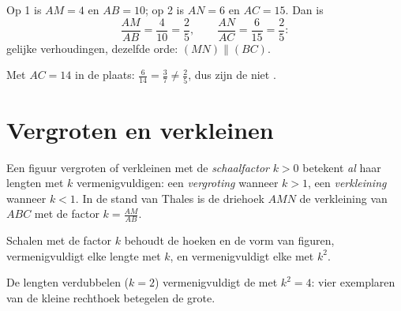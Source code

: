 \begin{example}\label{ex:g9:thales:converse}
Op  1 is $AM = 4$ en $AB = 10$; op  2 is $AN = 6$ en $AC = 15$. Dan is
\[
\frac{AM}{AB} = \frac{4}{10} = \frac25,
\qquad
\frac{AN}{AC} = \frac{6}{15} = \frac25 :
\]
gelijke verhoudingen, dezelfde orde: $(MN) \parallel (BC)$.

Met $AC = 14$ in de plaats: $\frac{6}{14} = \frac37 \neq \frac25$, dus zijn de
 niet .
\end{example}

\section{Vergroten en verkleinen}

\begin{definition}\label{def:g9:thales:scaling}
Een figuur vergroten of verkleinen met de \emph{schaalfactor}
$k > 0$ betekent \emph{al} haar lengten met $k$ vermenigvuldigen: een
\emph{vergroting} wanneer $k > 1$, een \emph{verkleining} wanneer $k < 1$. In de
stand van Thales is de driehoek $AMN$ de verkleining van $ABC$ met de factor
$k = \frac{AM}{AB}$.
\end{definition}

\begin{proposition}\label{prop:g9:thales:scaling}
Schalen met de factor $k$ behoudt de hoeken en de vorm van figuren,
vermenigvuldigt elke lengte met $k$, en vermenigvuldigt elke \emph{}
met $k^2$.
\end{proposition}
\admitted

\begin{omfigure}

{\small De lengten verdubbelen ($k = 2$) vermenigvuldigt de  met
$k^2 = 4$: vier exemplaren van de kleine rechthoek betegelen de grote.}
\end{omfigure}

